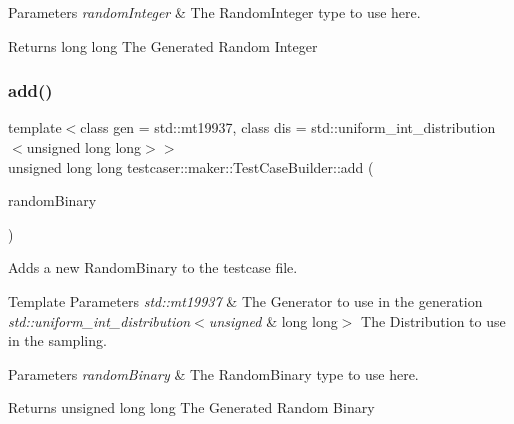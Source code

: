 \begin{DoxyParams}{Parameters}
{\em random\+Integer} & The Random\+Integer type to use here. \\
\hline
\end{DoxyParams}
\begin{DoxyReturn}{Returns}
long long The Generated Random Integer 
\end{DoxyReturn}
\mbox{\label{classtestcaser_1_1maker_1_1TestCaseBuilder_ae00a78ee096f8e1b6a59469445a99b53}} 
\subsubsection{\texorpdfstring{add()}{add()}\hspace{0.1cm}{\footnotesize\ttfamily [5/11]}}
{\footnotesize\ttfamily template$<$class gen  = std\+::mt19937, class dis  = std\+::uniform\+\_\+int\+\_\+distribution$<$unsigned long long$>$$>$ \\
unsigned long long testcaser\+::maker\+::\+Test\+Case\+Builder\+::add (\begin{DoxyParamCaption}\item[{\hyperlink{structtestcaser_1_1maker_1_1types_1_1RandomBinary}{types\+::\+Random\+Binary}$<$ gen, dis $>$ \&}]{random\+Binary }\end{DoxyParamCaption})\hspace{0.3cm}{\ttfamily [inline]}}



Adds a new Random\+Binary to the testcase file. 


\begin{DoxyTemplParams}{Template Parameters}
{\em std\+::mt19937} & The Generator to use in the generation \\
\hline
{\em std\+::uniform\+\_\+int\+\_\+distribution$<$unsigned} & long long$>$ The Distribution to use in the sampling. \\
\hline
\end{DoxyTemplParams}

\begin{DoxyParams}{Parameters}
{\em random\+Binary} & The Random\+Binary type to use here. \\
\hline
\end{DoxyParams}
\begin{DoxyReturn}{Returns}
unsigned long long The Generated Random Binary 
\end{DoxyReturn}
\mbox{\label{classtestcaser_1_1maker_1_1TestCaseBuilder_a4bab625f6da4431125ca3e9eb602eaad}} 

